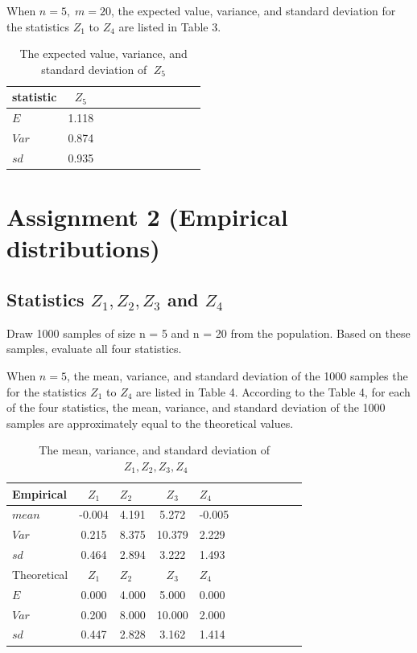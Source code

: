 \documentclass[a4paper,11pt,fleqn]{article}
\begin{document}
\vskip 0.5cm
When $n = 5,\; m = 20 $, the expected value, variance, and standard deviation for the statistics $Z_1$ to $Z_4$ are listed in Table 3. 

\begin{table}[htbp]
\caption{The expected value, variance, and standard deviation of $\;Z_5 $}
\vskip 0.5cm
\centering
 \begin{tabular}{lclclclclcl}
  \toprule
statistic &$Z_5$   \\
  \midrule
$E$       & 1.118   \\
$Var$     & 0.874   \\
$sd $     & 0.935   \\
  \bottomrule
 \end{tabular}
\end{table}




\section{Assignment 2 (Empirical distributions)}
\subsection{Statistics $Z_1, Z_2, Z_3$ and $Z_4$}
Draw 1000 samples of size n = 5 and n = 20 from the population. Based on these samples, evaluate all four statistics.
\vskip 0.5cm

When $n = 5$,  the mean, variance, and standard deviation of the 1000 samples the for the statistics $Z_1$ to $Z_4$ are listed in Table 4.  According to the Table 4, for each of the four statistics, the mean, variance, and standard deviation of the 1000 samples are approximately equal to  the theoretical values.

\vskip 0.5cm

\begin{table}[htbp]
\caption{The mean, variance, and standard deviation of $\;Z_1, Z_2, Z_3, Z_4 $}
\vskip 0.5cm
\centering
 \begin{tabular}{lclclclclcl}
  \toprule
Empirical &$Z_1$  &$Z_2$  &$Z_3$  &$Z_4$ \\
  \midrule
$mean$   & -0.004 &  4.191    & 5.272    & -0.005 \\
$Var$     & 0.215   &  8.375    & 10.379 & 2.229  \\
$sd $     & 0.464  &  2.894   & 3.222    & 1.493  \\
  \midrule
Theoretical &$Z_1$  &$Z_2$  &$Z_3$  &$Z_4$  \\
  \midrule
$E$       & 0.000  &  4.000 & 5.000    & 0.000 \\
$Var$     & 0.200   &  8.000    & 10.000   & 2.000 \\
$sd $     & 0.447  &  2.828 & 3.162 & 1.414\\
  \bottomrule
 \end{tabular}
\end{table}
\end{document}
